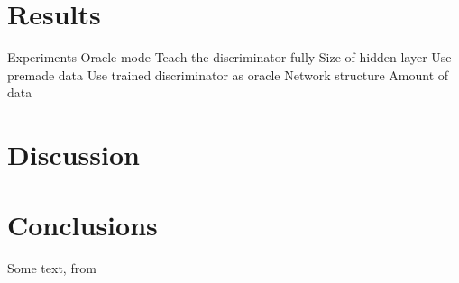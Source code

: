 \documentclass{article}
\begin{document}
\section{Results}
    Experiments
        Oracle mode
            Teach the discriminator fully
                Size of hidden layer
            Use premade data
            Use trained discriminator as oracle
        Network structure
        Amount of data

\section{Discussion}
\blindtext

\section{Conclusions}


Some text, from \cite{chollet2015keras}

{}

\end{document}
